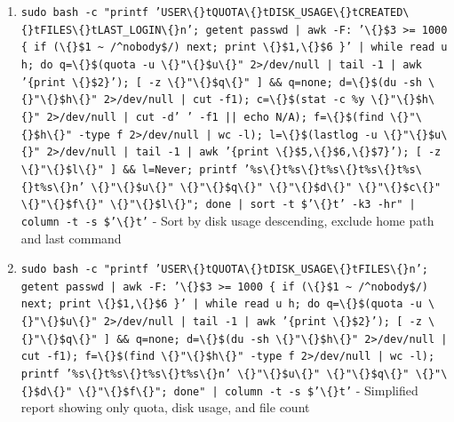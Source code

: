 \documentclass{article}
\begin{document}
\begin{enumerate}
  \item \texttt{sudo bash -c "printf 'USER\textbackslash\{\}tQUOTA\textbackslash\{\}tDISK\_USAGE\textbackslash\{\}tCREATED\textbackslash\{\}tFILES\textbackslash\{\}tLAST\_LOGIN\textbackslash\{\}n'; getent passwd | awk -F: '\textbackslash\{\}\$3 >= 1000 \{ if (\textbackslash\{\}\$1 \textasciitilde{} /\textasciicircum{}nobody\$/) next; print \textbackslash\{\}\$1,\textbackslash\{\}\$6 \}' | while read u h; do q=\textbackslash\{\}\$(quota -u \textbackslash\{\}"\textbackslash\{\}\$u\textbackslash\{\}" 2>/dev/null | tail -1 | awk '\{print \textbackslash\{\}\$2\}'); [ -z \textbackslash\{\}"\textbackslash\{\}\$q\textbackslash\{\}" ] \&\& q=none; d=\textbackslash\{\}\$(du -sh \textbackslash\{\}"\textbackslash\{\}\$h\textbackslash\{\}" 2>/dev/null | cut -f1); c=\textbackslash\{\}\$(stat -c \%y \textbackslash\{\}"\textbackslash\{\}\$h\textbackslash\{\}" 2>/dev/null | cut -d' ' -f1 || echo N/A); f=\textbackslash\{\}\$(find \textbackslash\{\}"\textbackslash\{\}\$h\textbackslash\{\}" -type f 2>/dev/null | wc -l); l=\textbackslash\{\}\$(lastlog -u \textbackslash\{\}"\textbackslash\{\}\$u\textbackslash\{\}" 2>/dev/null | tail -1 | awk '\{print \textbackslash\{\}\$5,\textbackslash\{\}\$6,\textbackslash\{\}\$7\}'); [ -z \textbackslash\{\}"\textbackslash\{\}\$l\textbackslash\{\}" ] \&\& l=Never; printf '\%s\textbackslash\{\}t\%s\textbackslash\{\}t\%s\textbackslash\{\}t\%s\textbackslash\{\}t\%s\textbackslash\{\}t\%s\textbackslash\{\}n' \textbackslash\{\}"\textbackslash\{\}\$u\textbackslash\{\}" \textbackslash\{\}"\textbackslash\{\}\$q\textbackslash\{\}" \textbackslash\{\}"\textbackslash\{\}\$d\textbackslash\{\}" \textbackslash\{\}"\textbackslash\{\}\$c\textbackslash\{\}" \textbackslash\{\}"\textbackslash\{\}\$f\textbackslash\{\}" \textbackslash\{\}"\textbackslash\{\}\$l\textbackslash\{\}"; done | sort -t \$'\textbackslash\{\}t' -k3 -hr" | column -t -s \$'\textbackslash\{\}t'} - Sort by disk usage descending, exclude home path and last command
  \item \texttt{sudo bash -c "printf 'USER\textbackslash\{\}tQUOTA\textbackslash\{\}tDISK\_USAGE\textbackslash\{\}tFILES\textbackslash\{\}n'; getent passwd | awk -F: '\textbackslash\{\}\$3 >= 1000 \{ if (\textbackslash\{\}\$1 \textasciitilde{} /\textasciicircum{}nobody\$/) next; print \textbackslash\{\}\$1,\textbackslash\{\}\$6 \}' | while read u h; do q=\textbackslash\{\}\$(quota -u \textbackslash\{\}"\textbackslash\{\}\$u\textbackslash\{\}" 2>/dev/null | tail -1 | awk '\{print \textbackslash\{\}\$2\}'); [ -z \textbackslash\{\}"\textbackslash\{\}\$q\textbackslash\{\}" ] \&\& q=none; d=\textbackslash\{\}\$(du -sh \textbackslash\{\}"\textbackslash\{\}\$h\textbackslash\{\}" 2>/dev/null | cut -f1); f=\textbackslash\{\}\$(find \textbackslash\{\}"\textbackslash\{\}\$h\textbackslash\{\}" -type f 2>/dev/null | wc -l); printf '\%s\textbackslash\{\}t\%s\textbackslash\{\}t\%s\textbackslash\{\}t\%s\textbackslash\{\}n' \textbackslash\{\}"\textbackslash\{\}\$u\textbackslash\{\}" \textbackslash\{\}"\textbackslash\{\}\$q\textbackslash\{\}" \textbackslash\{\}"\textbackslash\{\}\$d\textbackslash\{\}" \textbackslash\{\}"\textbackslash\{\}\$f\textbackslash\{\}"; done" | column -t -s \$'\textbackslash\{\}t'} - Simplified report showing only quota, disk usage, and file count

\end{enumerate}
\end{document}
